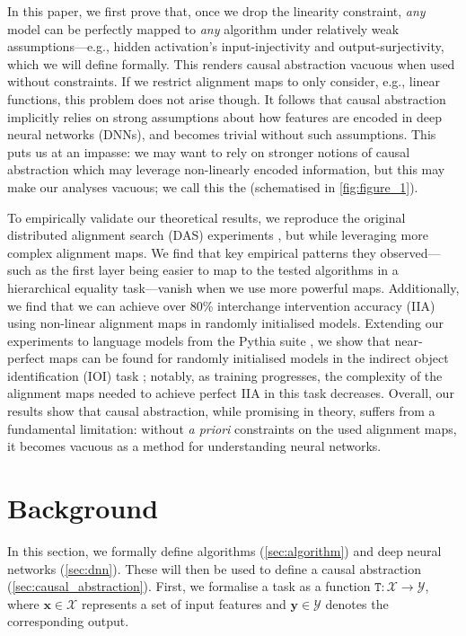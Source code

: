 \documentclass{article}
\newcommand{\bx}{\mathbf{x}}
\newcommand{\calX}{\mathcal{X}}
\newcommand{\by}{\mathbf{y}}
\newcommand{\calY}{\mathcal{Y}}
\newcommand{\ftask}{\mathtt{T}}
\begin{document}
In this paper, we first prove that, once we drop the linearity constraint, \emph{any} model can be perfectly mapped to \emph{any} algorithm under relatively weak assumptions---e.g., hidden activation's input-injectivity and output-surjectivity, which we will define formally.
This renders causal abstraction vacuous when used without constraints.
If we restrict alignment maps to only consider, e.g., linear functions, this problem does not arise though.
It follows that causal abstraction implicitly relies on strong assumptions about how features are encoded in deep neural networks (DNNs), and becomes trivial without such assumptions.
This puts us at an impasse: we may want to rely on stronger notions of causal abstraction which may leverage non-linearly encoded information, but this may make our analyses vacuous; we call this the  (schematised in \cref{fig:figure_1}).

To empirically validate our theoretical results, we reproduce the original distributed alignment search (DAS) experiments \citep{Geiger2023FindingAB}, but while leveraging more complex alignment maps. 
We find that key empirical patterns they observed---such as the first layer being easier to map to the tested algorithms in a hierarchical equality task---vanish when we use more powerful maps. 
Additionally, we find that we can achieve over 80\% interchange intervention accuracy (IIA) using non-linear alignment maps in randomly initialised models.
Extending our experiments to language models from the Pythia suite \citep{biderman2023pythia}, we show that near-perfect maps can be found for randomly initialised models in the indirect object identification (IOI) task \citep{wang2023interpretability}; notably, as training progresses, the complexity of the alignment maps needed to achieve perfect IIA in this task decreases. 
Overall, our results show that causal abstraction, while promising in theory, suffers from a fundamental limitation: without \textit{a priori} constraints on the used alignment maps, it becomes vacuous as a method for understanding neural networks.

\section{Background}\label{sec:background}
\newcommand{\Argmax}[2]{\mathtt{argmax}_{#1}(#2)}

In this section, we formally define algorithms (\cref{sec:algorithm}) and deep neural networks (\cref{sec:dnn}).
These will then be used to define a causal abstraction (\cref{sec:causal_abstraction}).
First, we formalise a task as a function $\ftask: \calX \to \calY$, where $\bx \in \calX$ represents a set of input features and $\by \in \calY$ denotes the corresponding output.
\end{document}
